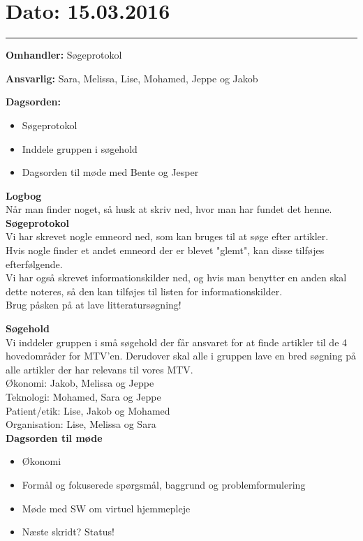 \section{Dato: 15.03.2016}
\hrule

\textbf{Omhandler:} Søgeprotokol

\textbf{Ansvarlig:} Sara, Melissa, Lise, Mohamed, Jeppe og Jakob

\textbf{Dagsorden:}
\begin{itemize}
	\item Søgeprotokol
	\item Inddele gruppen i søgehold
	\item Dagsorden til møde med Bente og Jesper
\end{itemize}

\textbf{Logbog}
\\
Når man finder noget, så husk at skriv ned, hvor man har fundet det henne. \\ 

\textbf{Søgeprotokol}
\\
Vi har skrevet nogle emneord ned, som kan bruges til at søge efter artikler. \\
Hvis nogle finder et andet emneord der er blevet "glemt", kan disse tilføjes efterfølgende.\\
Vi har også skrevet informationskilder ned, og hvis man benytter en anden skal dette noteres, så den kan tilføjes til listen for informationskilder.\\
Brug påsken på at lave litteratursøgning!

\textbf{Søgehold}
\\
Vi inddeler gruppen i små søgehold der får ansvaret for at finde artikler til de 4 hovedområder for MTV'en.
Derudover skal alle i gruppen lave en bred søgning på alle artikler der har relevans til vores MTV.\\
Økonomi: Jakob, Melissa og Jeppe\\
Teknologi: Mohamed, Sara og Jeppe\\
Patient/etik: Lise, Jakob og Mohamed\\
Organisation: Lise, Melissa og Sara \\

\textbf{Dagsorden til møde}
\\
\begin{itemize}
	\item Økonomi
	\item Formål og fokuserede spørgsmål, baggrund og problemformulering
	\item Møde med SW om virtuel hjemmepleje
	\item Næste skridt? Status!
\end{itemize}

